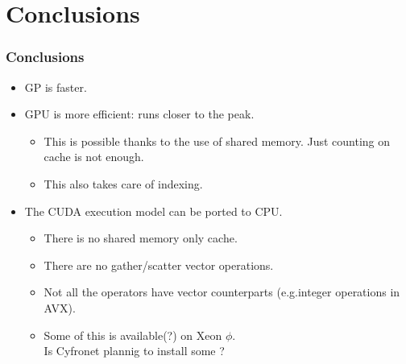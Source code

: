\documentclass{beamer}
\begin{document}
\section{Conclusions}

\begin{frame}
\frametitle{Conclusions}
\begin{itemize}
\item GP is faster. 
\item GPU is more efficient: runs closer to the peak.
\begin{itemize}
\item This is possible thanks to the use of shared memory. Just
  counting on cache is not enough.
\item This also takes care of indexing.
\end{itemize}
\item The CUDA execution model can be ported to CPU.
\begin{itemize}
\item There is no shared memory only cache.
\item There are no gather/scatter vector operations.
\item Not all the  operators have vector counterparts (e.g.integer operations in AVX).
\item Some of this is available(?) on Xeon $\phi$. \\
Is Cyfronet plannig to install some ? 
\end{itemize}
\end{itemize}
\end{frame}
\end{document}
